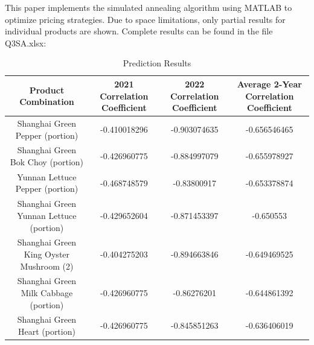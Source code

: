 \documentclass{article}
\begin{document}
		This paper implements the simulated annealing algorithm using MATLAB to optimize pricing strategies. Due to space limitations, only partial results for individual products are shown. Complete results can be found in the file Q3SA.xlsx:
		
		\begin{table}[htbp]
			\centering
			\renewcommand{\arraystretch}{1.5}
			\caption{Prediction Results}
			\begin{tabular}{cccc}
				\toprule
				\textbf{Product Combination} & \textbf{2021 Correlation Coefficient} & \textbf{2022 Correlation Coefficient} & \textbf{Average 2-Year Correlation Coefficient} \\
				\midrule
				Shanghai Green Pepper (portion) & -0.410018296 & -0.903074635 & -0.656546465 \\
				Shanghai Green Bok Choy (portion) & -0.426960775 & -0.884997079 & -0.655978927 \\
				Yunnan Lettuce Pepper (portion) & -0.468748579 & -0.83800917 & -0.653378874 \\
				Shanghai Green Yunnan Lettuce (portion) & -0.429652604 & -0.871453397 & -0.650553 \\
				Shanghai Green King Oyster Mushroom (2) & -0.404275203 & -0.894663846 & -0.649469525 \\
				Shanghai Green Milk Cabbage (portion) & -0.426960775 & -0.86276201 & -0.644861392 \\
				Shanghai Green Heart (portion) & -0.426960775 & -0.845851263 & -0.636406019 \\
				\bottomrule
			\end{tabular}
			\label{tab:prediction_results}
		\end{table}
		
		
		
	
\end{document}
